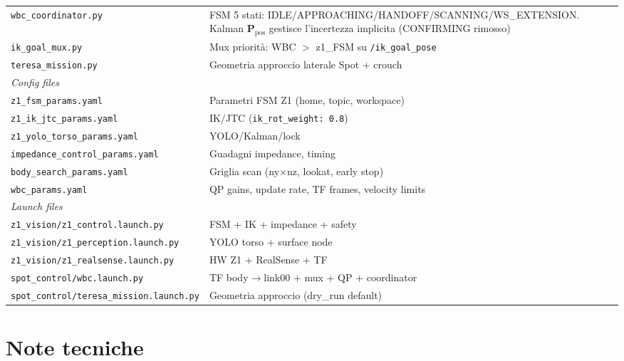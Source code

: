 \documentclass[a4paper,11pt]{article}
\begin{document}
\begin{center}
\begin{longtable}{lp{8.5cm}}
\texttt{wbc\_coordinator.py}               & FSM 5 stati: IDLE/APPROACHING/HANDOFF/SCANNING/WS\_EXTENSION.
                                             Kalman $\mathbf{P}_{\text{pos}}$ gestisce
                                             l'incertezza implicita (CONFIRMING rimosso) \\
\texttt{ik\_goal\_mux.py}                  & Mux priorità: WBC $>$ z1\_FSM su
                                             \texttt{/ik\_goal\_pose} \\
\texttt{teresa\_mission.py}                & Geometria approccio laterale Spot + crouch \\
\midrule
\multicolumn{2}{l}{\textit{Config files}} \\
\midrule
\texttt{z1\_fsm\_params.yaml}              & Parametri FSM Z1 (home, topic, workspace) \\
\texttt{z1\_ik\_jtc\_params.yaml}          & IK/JTC (\texttt{ik\_rot\_weight: 0.8}) \\
\texttt{z1\_yolo\_torso\_params.yaml}      & YOLO/Kalman/lock \\
\texttt{impedance\_control\_params.yaml}   & Guadagni impedance, timing \\
\texttt{body\_search\_params.yaml}         & Griglia scan (ny$\times$nz, lookat, early stop) \\
\texttt{wbc\_params.yaml}                  & QP gains, update rate, TF frames,
                                             velocity limits \\
\midrule
\multicolumn{2}{l}{\textit{Launch files}} \\
\midrule
\texttt{z1\_vision/z1\_control.launch.py}       & FSM + IK + impedance + safety \\
\texttt{z1\_vision/z1\_perception.launch.py}    & YOLO torso + surface node \\
\texttt{z1\_vision/z1\_realsense.launch.py}     & HW Z1 + RealSense + TF \\
\texttt{spot\_control/wbc.launch.py}            & TF body$\to$link00 + mux + QP + coordinator \\
\texttt{spot\_control/teresa\_mission.launch.py}& Geometria approccio (dry\_run default) \\
\bottomrule
\end{longtable}
\end{center}

\section{Note tecniche}
\end{document}
